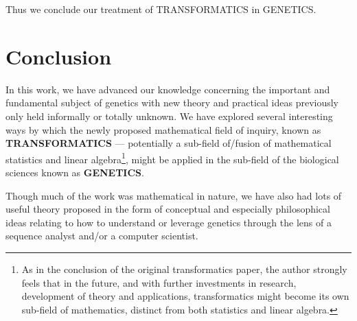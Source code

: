 \documentclass[a4paper, 18pt]{book} %
\begin{document}
Thus we conclude our treatment of TRANSFORMATICS in GENETICS.


\chapter{Conclusion}
\label{CONC}

In this work, we have advanced our knowledge concerning the important and fundamental subject of genetics with new theory and practical ideas previously only held informally or totally unknown. We have explored several interesting ways by which the newly proposed mathematical field of inquiry, known as \textbf{TRANSFORMATICS} --- potentially a sub-field of/fusion of mathematical statistics and linear algebra\footnote{As in the conclusion of the original transformatics paper\cite{transformatics}, the author strongly feels that in the future, and with further investments in research, development of theory and applications, transformatics might become its own sub-field of mathematics, distinct from both statistics and linear algebra.}, might be applied in the sub-field of the biological sciences known as \textbf{GENETICS}. 

Though much of the work was mathematical in nature, we have also had lots of useful theory proposed in the form of conceptual and especially philosophical ideas relating to how to understand or leverage genetics through the lens of a sequence analyst and/or a computer scientist. 
\end{document}
